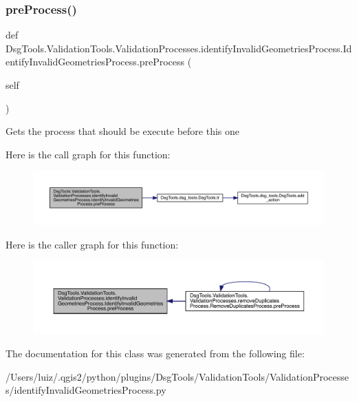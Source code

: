 \subsubsection{\texorpdfstring{pre\+Process()}{preProcess()}}
{\footnotesize\ttfamily def Dsg\+Tools.\+Validation\+Tools.\+Validation\+Processes.\+identify\+Invalid\+Geometries\+Process.\+Identify\+Invalid\+Geometries\+Process.\+pre\+Process (\begin{DoxyParamCaption}\item[{}]{self }\end{DoxyParamCaption})}

\begin{DoxyVerb}Gets the process that should be execute before this one
\end{DoxyVerb}
 Here is the call graph for this function\+:
\nopagebreak
\begin{figure}[H]
\begin{center}
\leavevmode
\includegraphics[width=350pt]{class_dsg_tools_1_1_validation_tools_1_1_validation_processes_1_1identify_invalid_geometries_pro5fada1db0a6bcf351a3763e9c36b27ae_a7c59eea662a62e46236b1e49b541b013_cgraph}
\end{center}
\end{figure}
Here is the caller graph for this function\+:
\nopagebreak
\begin{figure}[H]
\begin{center}
\leavevmode
\includegraphics[width=350pt]{class_dsg_tools_1_1_validation_tools_1_1_validation_processes_1_1identify_invalid_geometries_pro5fada1db0a6bcf351a3763e9c36b27ae_a7c59eea662a62e46236b1e49b541b013_icgraph}
\end{center}
\end{figure}


The documentation for this class was generated from the following file\+:\begin{DoxyCompactItemize}
\item 
/\+Users/luiz/.\+qgis2/python/plugins/\+Dsg\+Tools/\+Validation\+Tools/\+Validation\+Processes/identify\+Invalid\+Geometries\+Process.\+py\end{DoxyCompactItemize}
